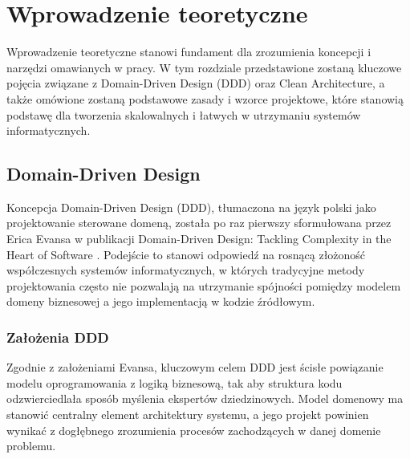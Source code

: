 \newpage
\section{Wprowadzenie teoretyczne}
Wprowadzenie teoretyczne stanowi fundament dla zrozumienia koncepcji i narzędzi omawianych w pracy. W tym rozdziale przedstawione zostaną kluczowe pojęcia związane z Domain-Driven Design (DDD) oraz Clean Architecture, a także omówione zostaną podstawowe zasady i wzorce projektowe, które stanowią podstawę dla tworzenia skalowalnych i łatwych w utrzymaniu systemów informatycznych.

\subsection{Domain-Driven Design}
Koncepcja Domain-Driven Design (DDD), tłumaczona na język polski jako projektowanie sterowane domeną, została po raz pierwszy sformułowana przez Erica Evansa w publikacji Domain-Driven Design: Tackling Complexity in the Heart of Software \cite{evans2004ddd}. Podejście to stanowi odpowiedź na rosnącą złożoność współczesnych systemów informatycznych, w których tradycyjne metody projektowania często nie pozwalają na utrzymanie spójności pomiędzy modelem domeny biznesowej a jego implementacją w kodzie źródłowym.

\subsubsection{Założenia DDD}
Zgodnie z założeniami Evansa, kluczowym celem DDD jest ścisłe powiązanie modelu oprogramowania z logiką biznesową, tak aby struktura kodu odzwierciedlała sposób myślenia ekspertów dziedzinowych. Model domenowy ma stanowić centralny element architektury systemu, a jego projekt powinien wynikać z dogłębnego zrozumienia procesów zachodzących w danej domenie problemu.

